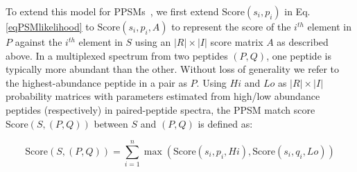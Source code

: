 \documentclass[arial,11pt]{article}
\begin{document}
To extend this model for PPSMs~\cite{wang2011peptide}, we first extend $\text{Score}(s_i, p_i)$ in Eq.\ref{eqPSMlikelihood} to $\text{Score}(s_i,p_i,A)$ to represent the score of the $i^{th}$ element in $P$ against the $i^{th}$ element in $S$ using an $|R|\times|I|$ score matrix $A$ as described above. In a multiplexed spectrum from two peptides $(P,Q)$,
  one peptide is typically more abundant than the other. Without loss of generality we refer to the highest-abundance peptide in a pair as $P$. Using $Hi$ and $Lo$ as $|R|\times|I|$ probability matrices with parameters estimated from high/low abundance peptides (respectively) in paired-peptide spectra, the PPSM match score $\text{Score}(S,(P,Q))$ between $S$ and $(P,Q)$ is defined as:

\begin{equation*}
  \text{Score}(S,(P,Q)) = \sum_{i=1}^{n}{\max(\text{Score}(s_{i}, p_{i},Hi), \text{Score}(s_{i}, q_{i},Lo))}
\end{equation*}

%
%
%
%
%
\end{document}
